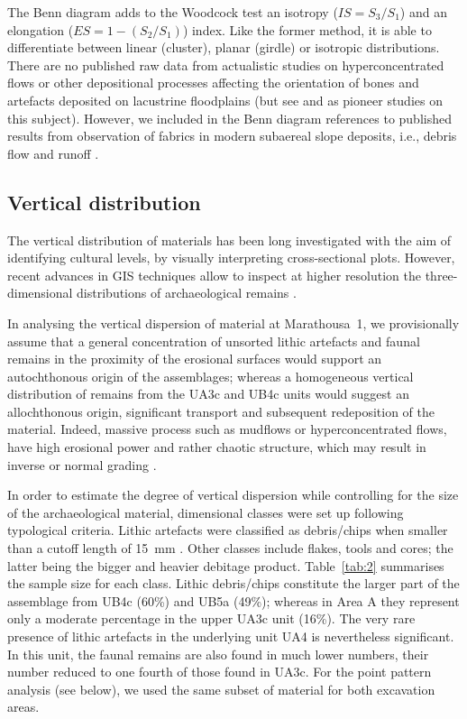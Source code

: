 \documentclass[preprint,authoryear,times]{elsarticle} %
\begin{document}
The Benn diagram \citep{Benn1994} adds to the Woodcock test an isotropy ($IS=S_3/S_1$) and an elongation ($ES=1-(S_2/S_1)$) index. Like the former method, it is able to differentiate between linear (cluster), planar (girdle) or isotropic distributions. There are no %
published raw data from actualistic studies on hyperconcentrated flows or other depositional processes affecting the orientation of bones and artefacts deposited on lacustrine floodplains (but see \cite{Morton2004} and \cite{Cobo-Sanchez2014} as pioneer studies on this subject). However, we included in the Benn diagram references to published results from observation of fabrics in modern subaereal slope deposits, i.e., debris flow and runoff \citep{Bertran1997,Lenoble2004}.

\subsection{Vertical distribution}

The vertical distribution of materials has been long investigated with the aim of identifying cultural levels, by visually interpreting cross-sectional plots. However, recent advances in GIS techniques allow to inspect at higher resolution the three-dimensional distributions of archaeological remains \citep[][among others]{McPherron2005a,Anderson2008}.

In analysing the vertical dispersion of material at Marathousa~1, we provisionally assume that a general concentration of unsorted lithic artefacts and faunal remains in the proximity of the erosional surfaces would support an autochthonous origin of the assemblages; whereas a homogeneous vertical distribution of remains from the UA3c and UB4c units would suggest an allochthonous origin, significant transport and subsequent redeposition of the material. Indeed, massive process such as mudflows or hyperconcentrated flows, have high erosional power and rather chaotic structure, which may result in inverse or normal grading \citep{Benvenuti2002}.

In order to estimate the degree of vertical dispersion while controlling for the size of the archaeological material, dimensional classes were set up following typological criteria. Lithic artefacts were classified as debris/chips when smaller than a cutoff length of 15~mm \citep{Tourloukis}. Other classes include flakes, tools and cores; the latter being the bigger and heavier debitage product. Table~\ref{tab:2} summarises the sample size for each class. Lithic debris/chips constitute the larger part of the assemblage from UB4c (60\%) and UB5a (49\%); whereas in Area A they represent only a moderate percentage in the upper UA3c unit (16\%). The very rare presence of lithic artefacts in the underlying unit UA4 is nevertheless significant. In this unit, the faunal remains are also found in much lower numbers, their number reduced to one fourth of those found in UA3c. For the point pattern analysis (see below), we used the same subset of material for both excavation areas.
\end{document}
